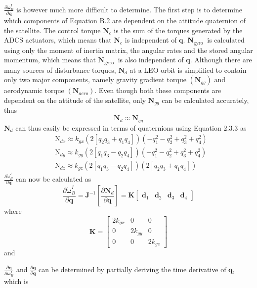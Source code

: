 $\frac{\partial \dot{\boldsymbol{\omega}}_{B}^{I}}{\partial \mathbf{q}}$ is however much more difficult to determine. The first step is to determine which components of Equation B.2 are dependent on the attitude quaternion of the satellite. The control torque $\mathbf{N}_{c}$ is the sum of the torques generated by the ADCS actuators, which means that $\mathbf{N}_{c}$ is independent of $\mathbf{q}$. $\mathbf{N}_{\text {gyro }}$ is calculated using only the moment of inertia matrix, the angular rates and the stored angular momentum, which means that $\mathbf{N}_{\text {gyro }}$ is also independent of $\mathbf{q}$. Although there are many sources of disturbance torques, $\mathbf{N}_{d}$ at a LEO orbit is simplified to contain only two major components, namely gravity gradient torque $\left(\mathbf{N}_{g g}\right)$ and aerodynamic torque $\left(\mathbf{N}_{a e r o}\right)$. Even though both these components are dependent on the attitude of the satellite, only $\mathbf{N}_{g g}$ can be calculated accurately, thus
$$
\mathbf{N}_{d} \approx \mathbf{N}_{g g}
$$
$\mathbf{N}_{d}$ can thus easily be expressed in terms of quaternions using Equation $2.3 .3$ as
$$
\begin{aligned}
&\mathrm{N}_{d x} \approx k_{g x}\left(2\left[q_{2} q_{3}+q_{1} q_{4}\right]\right)\left(-q_{1}^{2}-q_{2}^{2}+q_{3}^{2}+q_{4}^{2}\right) \\
&\mathrm{N}_{d y} \approx k_{g y}\left(2\left[q_{1} q_{3}-q_{2} q_{4}\right]\right)\left(-q_{1}^{2}-q_{2}^{2}+q_{3}^{2}+q_{4}^{2}\right) \\
&\mathrm{N}_{d z} \approx k_{g z}\left(2\left[q_{1} q_{3}-q_{2} q_{4}\right]\right)\left(2\left[q_{2} q_{3}+q_{1} q_{4}\right]\right)
\end{aligned}
$$
$\frac{\partial \dot{\omega}_{B}^{I}}{\partial \mathbf{q}}$ can now be calculated as
$$
\frac{\partial \dot{\boldsymbol{\omega}}_{B}^{I}}{\partial \mathbf{q}}=\mathbf{J}^{-1}\left[\frac{\partial \mathbf{N}_{d}}{\partial \mathbf{q}}\right]=\mathbf{K}\left[\begin{array}{llll}
\mathbf{d}_{1} & \mathbf{d}_{2} & \mathbf{d}_{3} & \mathbf{d}_{4}
\end{array}\right]
$$
where
$$
\mathbf{K}=\left[\begin{array}{ccc}
2 k_{g x} & 0 & 0 \\
0 & 2 k_{g y} & 0 \\
0 & 0 & 2 k_{g z}
\end{array}\right]
$$
and

$\frac{\partial \dot{\mathbf{q}}}{\partial \boldsymbol{\omega}_{B}^{I}}$ and $\frac{\partial \dot{\mathbf{q}}}{\partial \mathbf{q}}$ can be determined by partially deriving the time derivative of $\mathbf{q}$, which is

